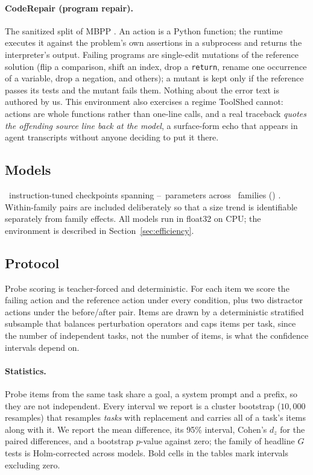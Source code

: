 \paragraph{CodeRepair (program repair).}
The sanitized split of MBPP \citep{austin2021mbpp}. An action is a Python
function; the runtime executes it against the problem's own assertions in a
subprocess and returns the interpreter's output. Failing programs are
single-edit mutations of the reference solution (flip a comparison, shift an
index, drop a \texttt{return}, rename one occurrence of a variable, drop a
negation, and others); a mutant is kept only if the reference passes its tests
and the mutant fails them. Nothing about the error text is authored by us. This
environment also exercises a regime ToolShed cannot: actions are whole functions
rather than one-line calls, and a real traceback \emph{quotes the offending source line back at the model}, a surface-form
echo that appears in agent transcripts without anyone deciding to put it there.



\subsection{Models}

\NumModels\ instruction-tuned checkpoints spanning \SmallestModel--\LargestModel\
parameters across \NumFamilies\ families (\FamilyList)
\citep{allal2025smollm2,qwen2024qwen25,qwen2025qwen3,grattafiori2024llama3}.
Within-family pairs are included deliberately so that a size trend is
identifiable separately from family effects. All models run in float32 on CPU;
the environment is described in Section~\ref{sec:efficiency}.

\subsection{Protocol}

Probe scoring is teacher-forced and deterministic. For each item we score the
failing action and the reference action under every condition, plus two
distractor actions under the before/after pair. Items are drawn by a
deterministic stratified subsample that balances perturbation operators and
caps items per task, since the number of independent tasks, not the number of items, is what the
confidence intervals depend on.

\paragraph{Statistics.}
Probe items from the same task share a goal, a system prompt and a prefix, so
they are not independent. Every interval we report is a cluster bootstrap
($10{,}000$ resamples) that resamples \emph{tasks} with replacement and carries
all of a task's items along with it. We report the mean difference, its 95\%
interval, Cohen's $d_z$ for the paired differences, and a bootstrap $p$-value
against zero; the family of headline $G$ tests is Holm-corrected across models.
Bold cells in the tables mark intervals excluding zero.

